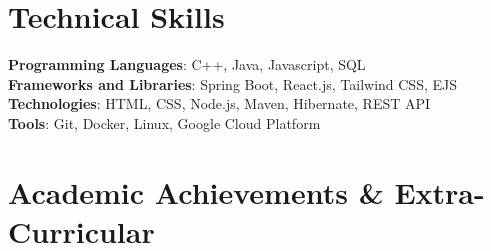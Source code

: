 \documentclass[letterpaper,11pt]{article}
\makeatletter
\newcommand{\resumeItem}[1]{
  \item\small{
    {#1 \vspace{-2pt}}
  }
}
\newcommand{\resumeProjectHeading}[2]{
    \item
    \begin{tabular*}{0.97\textwidth}{l@{\extracolsep{\fill}}r}
      \small#1 & #2 \\
    \end{tabular*}\vspace{-7pt}
}
\newcommand{\resumeSubHeadingListStart}{\begin{itemize}[leftmargin=0.15in, label={}]}
\newcommand{\resumeSubHeadingListEnd}{\end{itemize}}
\newcommand{\resumeItemListStart}{\begin{itemize}}
\newcommand{\resumeItemListEnd}{\end{itemize}\vspace{-5pt}}
\makeatother
\begin{document}
\section{Technical Skills}
 \begin{itemize}[leftmargin=0.15in, label={}]
    \small{\item{
     \textbf{Programming Languages}{: C++, Java, Javascript, SQL} \\
     \textbf{Frameworks and Libraries}{: Spring Boot, React.js, Tailwind CSS, EJS} \\
     \textbf{Technologies}{: HTML, CSS, Node.js, Maven, Hibernate, REST API}\\
     \textbf{Tools}{: Git, Docker, Linux, Google Cloud Platform}
    }}
 \end{itemize}


          
    



\section{Academic Achievements \& Extra-Curricular}
\end{document}
